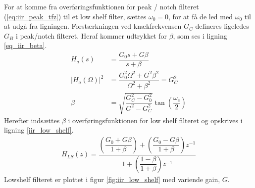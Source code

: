 	
	For at komme fra overføringsfunktionen for peak / notch filteret (\ref{eq:iir_peak_tfz}) til et low shelf filter, sættes $\omega_0 = 0$, for at få de led med $\omega_0$ til at udgå fra ligningen. 
	Forstærkningen ved knækfrekvensen $G_C$ defineres ligeledes $G_B$ i peak/notch filteret.
    Heraf kommer udtrykket for $\beta$, som ses i ligning \ref{eq_iir_beta}.
    \begin{align}
        H_a (s) &= \dfrac{G_0 s + G \beta}{s + \beta} \nonumber \\
        |H_a (\Omega)|^2 &= \dfrac{G_0^2 \Omega^2 + G^2 \beta^2}{\Omega^2 + \beta^2} = G_C^2 \nonumber \\
        \beta &= \sqrt{\dfrac{G_C^2 - G_0^2}{G^2 - G_C^2}} \tan \left( \dfrac{\omega_c}{2} \right) \label{eq_iir_beta}
    \end{align}
	Herefter indsættes $\beta$ i overføringsfunktionen for low shelf filteret og opskrives i ligning \ref{iir_low_shelf}.
     \begin{align}
      H_{LS}(z) =   \dfrac{\left(\dfrac{G_0 + G \beta}{1 + \beta} \right)+ \left(\dfrac{ G_0 - G \beta}{1 + \beta }\right) z^{-1}}{1 + \left( \dfrac{1 - \beta}{1 + \beta} \right) z^{-1}} \label{iir_low_shelf}
     \end{align}
	Lowshelf filteret er plottet i figur \ref{fig:iir_low_shelf} med variende gain, $G$.
   
   
